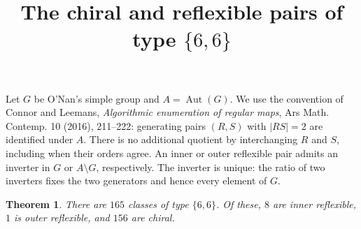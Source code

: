 \documentclass[11pt]{article}
\title{The chiral and reflexible pairs of type $\{6,6\}$}
\author{}\date{}
\newtheorem{theorem}{Theorem}
\newcommand{\Aut}{\operatorname{Aut}}
\begin{document}
\maketitle
Let $G$ be O'Nan's simple group and $A=\Aut(G)$. We use the convention
of Connor and Leemans, \emph{Algorithmic enumeration of regular maps},
Ars Math. Contemp. 10 (2016), 211--222: generating pairs $(R,S)$ with
$|RS|=2$ are identified under $A$. There is no additional quotient by
interchanging $R$ and $S$, including when their orders agree. An inner
or outer reflexible pair admits an inverter in $G$ or $A\setminus G$,
respectively. The inverter is unique: the ratio of two inverters fixes
the two generators and hence every element of $G$.

\begin{theorem}
There are $165$ classes of type $\{6,6\}$. Of these, $8$ are inner
reflexible, $1$ is outer reflexible, and $156$ are chiral.
\end{theorem}
\end{document}
